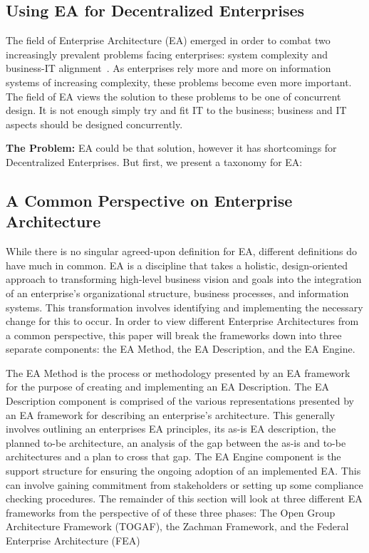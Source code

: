 \subsection{Using EA for Decentralized Enterprises}
The field of Enterprise Architecture (EA) emerged in order to combat two increasingly prevalent problems facing enterprises: system complexity and business-IT alignment~\cite{sessions2007}. As enterprises rely more and more on information systems of increasing complexity, these problems become even more important. The field of EA views the solution to these problems to be one of concurrent design. It is not enough simply try and fit IT to the business; business and IT aspects should be designed concurrently.

%   
    
\textbf{The Problem: }EA could be that solution, however it has shortcomings for Decentralized Enterprises. But first, we present a taxonomy for EA:

\subsection{A Common Perspective on Enterprise Architecture}
While there is no singular agreed-upon definition for EA, different definitions\cite{jungle2004,GartnerInc,ross2006,pearlson2009,lankhorst2009,sessions2007,togaf9.1} do have much in common. EA is a discipline that takes a holistic, design-oriented approach to transforming high-level business vision and goals into the integration of an enterprise's organizational structure, business processes, and information systems. This transformation involves identifying and implementing the necessary change for this to occur. In order to view different Enterprise Architectures from a common perspective, this paper will break the frameworks down into three separate components: the EA Method, the EA Description, and the EA Engine. 

The EA Method is the process or methodology presented by an EA framework for the purpose of creating and implementing an EA Description. The EA Description component is comprised of the various representations presented by an EA framework for describing an enterprise's architecture. This generally involves outlining an enterprises EA principles, its as-is EA description,  the planned to-be architecture, an analysis of the gap between the as-is and to-be architectures and a plan to cross that gap. The EA Engine component is the support structure for ensuring the ongoing adoption of an implemented EA. This can involve gaining commitment from stakeholders or setting up some compliance checking procedures. The remainder of this section will look at three different EA frameworks from the perspective of of these three phases: The Open Group Architecture Framework (TOGAF), the Zachman Framework, and the Federal Enterprise Architecture (FEA)

